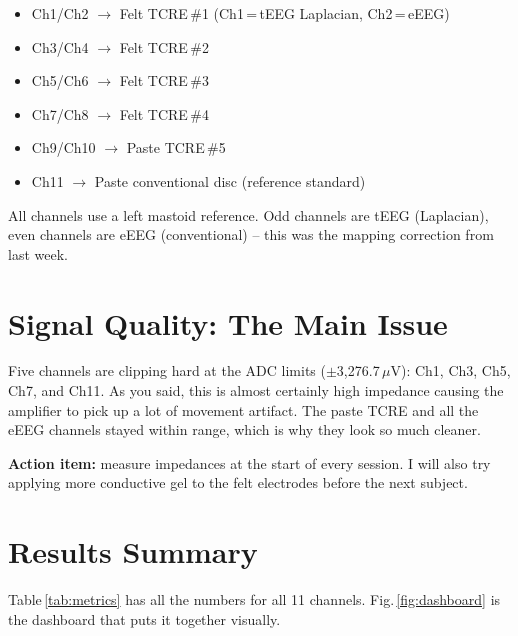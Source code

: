 \documentclass[10pt,conference]{IEEEtran}
\begin{document}
\begin{itemize}
  \item Ch1/Ch2 $\to$ Felt TCRE\,\#1 (Ch1\,=\,tEEG Laplacian, Ch2\,=\,eEEG)
  \item Ch3/Ch4 $\to$ Felt TCRE\,\#2
  \item Ch5/Ch6 $\to$ Felt TCRE\,\#3
  \item Ch7/Ch8 $\to$ Felt TCRE\,\#4
  \item Ch9/Ch10 $\to$ Paste TCRE\,\#5
  \item Ch11 $\to$ Paste conventional disc (reference standard)
\end{itemize}

All channels use a left mastoid reference.
Odd channels are tEEG (Laplacian), even channels are eEEG (conventional) --
this was the mapping correction from last week.

\section{Signal Quality: The Main Issue}

Five channels are clipping hard at the ADC limits ($\pm$3,276.7\,$\mu$V):
Ch1, Ch3, Ch5, Ch7, and Ch11.
As you said, this is almost certainly high impedance causing the amplifier
to pick up a lot of movement artifact.
The paste TCRE and all the eEEG channels stayed within range, which is
why they look so much cleaner.

\textbf{Action item:} measure impedances at the start of every session.
I will also try applying more conductive gel to the felt electrodes before
the next subject.

\section{Results Summary}

Table\,\ref{tab:metrics} has all the numbers for all 11 channels.
Fig.\,\ref{fig:dashboard} is the dashboard that puts it together visually.
\end{document}
